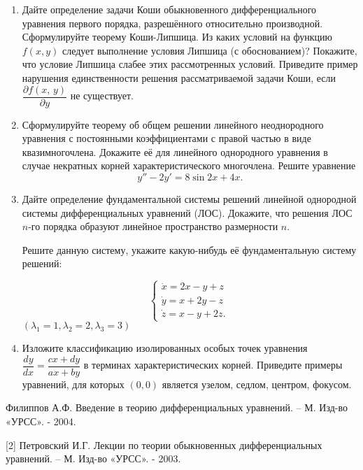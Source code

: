 %
%

\begin{enumerate}[resume]
\item Дайте определение задачи Коши обыкновенного дифференциального уравнения первого порядка, разрешённого относительно производной. Сформулируйте теорему Коши-Липшица. Из каких условий на функцию $f(x, y)$ следует выполнение условия Липшица (с обоснованием)?  Покажите, что условие Липшица слабее этих рассмотренных условий. Приведите пример нарушения единственности решения рассматриваемой задачи Коши, если $\dfrac{\partial f(x,\,y)}{\partial y}$ не существует. 

\item Сформулируйте теорему об общем решении линейного неоднородного уравнения с постоянными коэффициентами с правой частью в виде квазимногочлена. Докажите её для линейного однородного уравнения в случае некратных корней характеристического многочлена.
Решите уравнение
 $$y''-2y'=8 \sin 2 x+4x.$$

\item Дайте определение фундаментальной системы решений линейной однородной системы дифференциальных уравнений (ЛОС). Докажите, что решения ЛОС $n$-го порядка образуют линейное пространство размерности $n$. 

Решите данную систему, укажите какую-нибудь её фундаментальную систему решений:


\begin{equation*}
 \begin{cases}
   \dot{x}=2 x-y+z\\
\dot{y}=x+2y-z\\
\dot{z}=x-y+2z.
  \
 \end{cases}  
\end{equation*}
$(\lambda_{1}=1, \lambda_2=2, \lambda_3=3)$

\item Изложите классификацию изолированных особых точек уравнения $\dfrac{dy}{dx}=\dfrac{cx+dy}{ax+by}$ в терминах характеристических корней. Приведите примеры уравнений, для которых $(0, 0)$ является узелом, седлом, центром, фокусом.

\end{enumerate}

\bigskip
[1] Филиппов А.Ф. Введение в теорию дифференциальных уравнений. – М. Изд-во «УРСС». - 2004.

[2] Петровский И.Г. Лекции по теории обыкновенных дифференциальных уравнений. – М. Изд-во «УРСС». - 2003.


